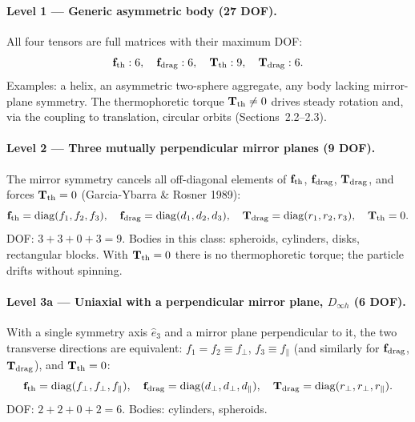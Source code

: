 \documentclass[11pt]{article}
\newcommand{\chg}[1]{\marginpar{\raggedright\footnotesize\textcolor{red!70!black}{\textsf{#1}}}}
\begin{document}
\paragraph{Level 1 --- Generic asymmetric body (27 DOF).} All four tensors are full matrices with their maximum DOF:
\begin{equation}
  \mathbf f_{\rm th}:6,\quad \mathbf f_{\rm drag}:6,\quad \mathbf T_{\rm th}:9,\quad \mathbf T_{\rm drag}:6.
\end{equation}
Examples: a helix, an asymmetric two-sphere aggregate, any body lacking mirror-plane symmetry. The thermophoretic torque $\mathbf T_{\rm th}\neq0$ drives steady rotation and, via the coupling to translation, circular orbits (Sections~2.2--2.3).\chg{C5}

\paragraph{Level 2 --- Three mutually perpendicular mirror planes (9 DOF).}\chg{C6} The mirror symmetry cancels all off-diagonal elements of $\mathbf f_{\rm th}$, $\mathbf f_{\rm drag}$, $\mathbf T_{\rm drag}$, and forces $\mathbf T_{\rm th}=0$ (Garcia-Ybarra \& Rosner 1989):
\begin{equation}
  \mathbf f_{\rm th}=\mathrm{diag}(f_1,f_2,f_3),\quad \mathbf f_{\rm drag}=\mathrm{diag}(d_1,d_2,d_3),\quad \mathbf T_{\rm drag}=\mathrm{diag}(r_1,r_2,r_3),\quad \mathbf T_{\rm th}=0.
\end{equation}
DOF: $3+3+0+3=9$. Bodies in this class: spheroids, cylinders, disks, rectangular blocks. With $\mathbf T_{\rm th}=0$ there is no thermophoretic torque; the particle drifts without spinning.

\paragraph{Level 3a --- Uniaxial with a perpendicular mirror plane, $D_{\infty h}$ (6 DOF).}\chg{C7} With a single symmetry axis $\hat e_3$ and a mirror plane perpendicular to it, the two transverse directions are equivalent: $f_1=f_2\equiv f_\perp$, $f_3\equiv f_\parallel$ (and similarly for $\mathbf f_{\rm drag}$, $\mathbf T_{\rm drag}$), and $\mathbf T_{\rm th}=0$:
\begin{equation}
  \mathbf f_{\rm th}=\mathrm{diag}(f_\perp,f_\perp,f_\parallel),\quad
  \mathbf f_{\rm drag}=\mathrm{diag}(d_\perp,d_\perp,d_\parallel),\quad
  \mathbf T_{\rm drag}=\mathrm{diag}(r_\perp,r_\perp,r_\parallel).
\end{equation}
DOF: $2+2+0+2=6$. Bodies: cylinders, spheroids.
\end{document}
